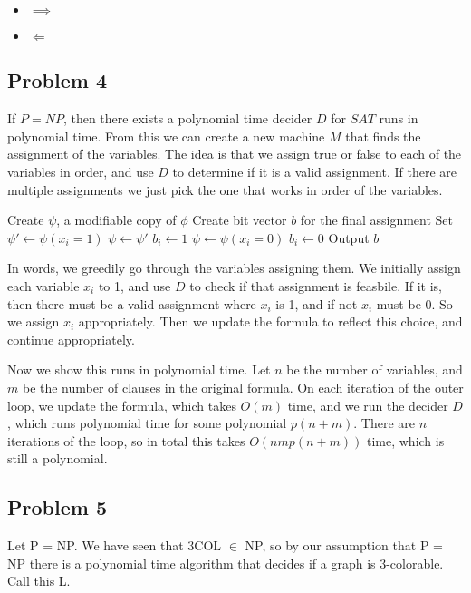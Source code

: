\documentclass[english]{article}
\begin{document}
\begin{itemize}
	\item $\implies$
	
	\item $\Longleftarrow$
	
\end{itemize}

\subsection*{Problem 4}
If $P = NP$, then there exists a polynomial time decider $D$ for $SAT$ runs in polynomial time. From this we can
create a new machine $M$ that finds the assignment of the variables. The idea is that we assign true or false to
each of the variables in order, and use $D$ to determine if it is a valid assignment. If there are multiple
assignments we just pick the one that works in order of the variables.

\begin{algorithmic}
	\State Create $\psi$, a modifiable copy of $\phi$
	\State Create bit vector $b$ for the final assignment
		\State Set $\psi' \leftarrow \psi(x_i=1)$
			\State $\psi \leftarrow \psi'$
			\State $b_i \leftarrow 1$ 
		\Else
			\State $\psi \leftarrow \psi(x_i=0)$
			\State $b_i \leftarrow 0$ 
		\EndIf
	\EndFor
	\State Output $b$
\EndFunction 
\end{algorithmic}

In words, we greedily go through the variables assigning them. We initially assign each variable $x_i$ to 1, and use
$D$ to check if that assignment is feasbile. If it is, then there must be a valid assignment where $x_i$ is 1, and if
not $x_i$ must be 0. So we assign $x_i$ appropriately. Then we update the formula to reflect this choice, and
continue appropriately.

Now we show this runs in polynomial time. Let $n$ be the number of variables, and $m$ be the number of clauses in the
original formula. On each iteration of the outer loop, we update the formula, which takes $O(m)$ time, and we run
the decider $D$, which runs polynomial time for some polynomial $p(n+m)$. There are $n$ iterations of the loop, so in
total this takes $O(nm p(n+m))$ time, which is still a polynomial.

\subsection*{Problem 5}
Let P = NP. We have seen that 3COL $\in$ NP, so by our assumption that P = NP there is a polynomial
time algorithm that decides if a graph is 3-colorable. Call this L.
\end{document}
